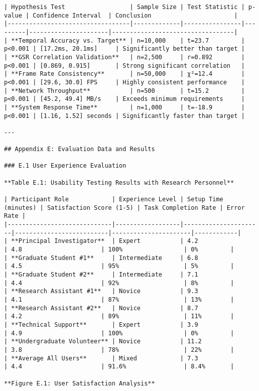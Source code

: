 \documentclass[12pt,a4paper]{report}
\begin{document}
\begin{verbatim}
| Hypothesis Test                  | Sample Size | Test Statistic | p-value | Confidence Interval  | Conclusion                       |
|----------------------------------|-------------|----------------|---------|----------------------|----------------------------------|
| **Temporal Accuracy vs. Target** | n=10,000    | t=23.7         | p<0.001 | [17.2ms, 20.1ms]     | Significantly better than target |
| **GSR Correlation Validation**   | n=2,500     | r=0.892        | p<0.001 | [0.869, 0.915]       | Strong significant correlation   |
| **Frame Rate Consistency**       | n=50,000    | χ²=12.4        | p<0.001 | [29.6, 30.0] FPS     | Highly consistent performance    |
| **Network Throughput**           | n=500       | t=15.2         | p<0.001 | [45.2, 49.4] MB/s    | Exceeds minimum requirements     |
| **System Response Time**         | n=1,000     | t=-18.9        | p<0.001 | [1.16, 1.52] seconds | Significantly faster than target |

---

## Appendix E: Evaluation Data and Results

### E.1 User Experience Evaluation

**Table E.1: Usability Testing Results with Research Personnel**

| Participant Role            | Experience Level | Setup Time (minutes) | Satisfaction Score (1-5) | Task Completion Rate | Error Rate |
|-----------------------------|------------------|----------------------|--------------------------|----------------------|------------|
| **Principal Investigator**  | Expert           | 4.2                  | 4.8                      | 100%                 | 0%         |
| **Graduate Student #1**     | Intermediate     | 6.8                  | 4.5                      | 95%                  | 5%         |
| **Graduate Student #2**     | Intermediate     | 7.1                  | 4.4                      | 92%                  | 8%         |
| **Research Assistant #1**   | Novice           | 9.3                  | 4.1                      | 87%                  | 13%        |
| **Research Assistant #2**   | Novice           | 8.7                  | 4.2                      | 89%                  | 11%        |
| **Technical Support**       | Expert           | 3.9                  | 4.9                      | 100%                 | 0%         |
| **Undergraduate Volunteer** | Novice           | 11.2                 | 3.8                      | 78%                  | 22%        |
| **Average All Users**       | Mixed            | 7.3                  | 4.4                      | 91.6%                | 8.4%       |

**Figure E.1: User Satisfaction Analysis**

\end{verbatim}
\end{document}
